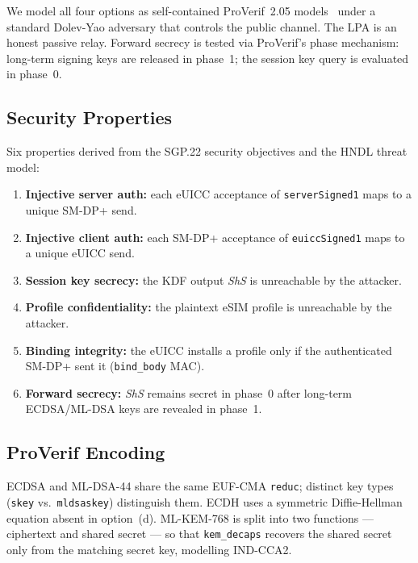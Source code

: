 \documentclass[final,3p,times,twocolumn]{elsarticle}
\begin{document}
We model all four options as self-contained ProVerif~2.05
models~\citep{blanchet2016proverif} under a standard Dolev-Yao adversary
that controls the public channel.  The LPA is an honest passive relay.
Forward secrecy is tested via ProVerif's phase mechanism: long-term
signing keys are released in phase~1; the session key query is evaluated
in phase~0.

\subsection{Security Properties}\label{sec:fv-props}

Six properties derived from the SGP.22 security objectives and the HNDL
threat model:

\begin{enumerate}[leftmargin=*, noitemsep, topsep=2pt, label=\textbf{Q\arabic*.}]
  \item \textbf{Injective server auth:}  each eUICC acceptance of
        \texttt{serverSigned1} maps to a unique SM-DP+ send.
  \item \textbf{Injective client auth:}  each SM-DP+ acceptance of
        \texttt{euiccSigned1} maps to a unique eUICC send.
  \item \textbf{Session key secrecy:}  the KDF output \textit{ShS}
        is unreachable by the attacker.
  \item \textbf{Profile confidentiality:}  the plaintext eSIM profile
        is unreachable by the attacker.
  \item \textbf{Binding integrity:}  the eUICC installs a profile only
        if the authenticated SM-DP+ sent it (\texttt{bind\_body} MAC).
  \item \textbf{Forward secrecy:}  \textit{ShS} remains secret in
        phase~0 after long-term ECDSA/ML-DSA keys are revealed in
        phase~1.
\end{enumerate}

\subsection{ProVerif Encoding}\label{sec:fv-encoding}

ECDSA and ML-DSA-44 share the same EUF-CMA \texttt{reduc}; distinct
key types (\texttt{skey} vs.\ \texttt{mldsaskey}) distinguish them.
ECDH uses a symmetric Diffie-Hellman equation absent in option~(d).
ML-KEM-768 is split into two functions --- ciphertext and shared secret
--- so that \texttt{kem\_decaps} recovers the shared secret only from the
matching secret key, modelling IND-CCA2.
\end{document}
